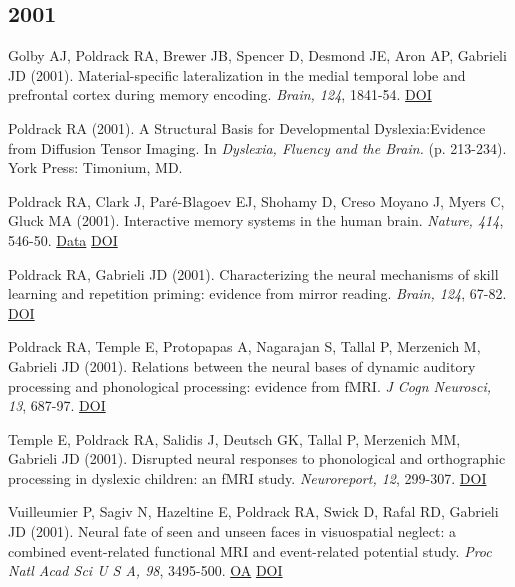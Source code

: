\documentclass[10pt, letterpaper]{article}
\begin{document}
\subsection*{2001}Golby AJ, Poldrack RA, Brewer JB, Spencer D, Desmond JE, Aron AP, Gabrieli JD (2001). Material-specific lateralization in the medial temporal lobe and prefrontal cortex during memory encoding. \textit{Brain, 124}, 1841-54. \href{http://dx.doi.org/10.1093/brain/124.9.1841}{DOI} \vspace{2mm}

Poldrack RA (2001). A Structural Basis for Developmental Dyslexia:Evidence from Diffusion Tensor Imaging. In \textit{Dyslexia, Fluency and the Brain.} (p. 213-234). York Press: Timonium, MD. \vspace{2mm}

Poldrack RA, Clark J, Paré-Blagoev EJ, Shohamy D, Creso Moyano J, Myers C, Gluck MA (2001). Interactive memory systems in the human brain. \textit{Nature, 414}, 546-50. \href{https://openneuro.org/datasets/ds000052/versions/00001}{Data} \href{http://dx.doi.org/10.1038/35107080}{DOI} \vspace{2mm}

Poldrack RA, Gabrieli JD (2001). Characterizing the neural mechanisms of skill learning and repetition priming: evidence from mirror reading. \textit{Brain, 124}, 67-82. \href{http://dx.doi.org/10.1093/brain/124.1.67}{DOI} \vspace{2mm}

Poldrack RA, Temple E, Protopapas A, Nagarajan S, Tallal P, Merzenich M, Gabrieli JD (2001). Relations between the neural bases of dynamic auditory processing and phonological processing: evidence from fMRI. \textit{J Cogn Neurosci, 13}, 687-97. \href{http://dx.doi.org/10.1162/089892901750363235}{DOI} \vspace{2mm}

Temple E, Poldrack RA, Salidis J, Deutsch GK, Tallal P, Merzenich MM, Gabrieli JD (2001). Disrupted neural responses to phonological and orthographic processing in dyslexic children: an fMRI study. \textit{Neuroreport, 12}, 299-307. \href{http://dx.doi.org/10.1097/00001756-200102120-00024}{DOI} \vspace{2mm}

Vuilleumier P, Sagiv N, Hazeltine E, Poldrack RA, Swick D, Rafal RD, Gabrieli JD (2001). Neural fate of seen and unseen faces in visuospatial neglect: a combined event-related functional MRI and event-related potential study. \textit{Proc Natl Acad Sci U S A, 98}, 3495-500. \href{https://www.ncbi.nlm.nih.gov/pmc/articles/PMC30681}{OA} \href{http://dx.doi.org/10.1073/pnas.051436898}{DOI} \vspace{2mm}
\end{document}
